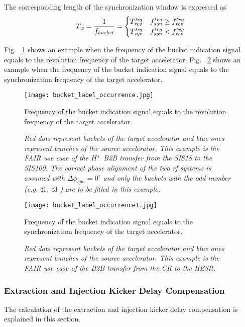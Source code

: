 The corresponding length of the synchronization window is expressed as
\begin{eqnarray}
T_\mathit{w}=\frac{1}{f_\mathit{bucket}}=
\begin{cases}
T_\mathit{rev}^\mathit{trg} &f_{\mathit{syn}}^{trg}\ge f_{\mathit{rev}}^{trg}\cr

T_\mathit{syn}^\mathit{trg}
&f_{\mathit{syn}}^{trg}<f_{\mathit{rev}}^{trg}
\end{cases}
\end{eqnarray}


Fig. ~\ref{bucket_label_occurrence} shows an example when the frequency of the bucket indication signal equals to the revolution frequency of the target accelerator. Fig. ~\ref{bucket_label_occurrence1} shows an example when the frequency of the bucket indication signal equals to the synchronization frequency of the target accelerator. 
\begin{figure}[!htb]
   \centering   
   \texttt{[image: bucket\_label\_occurrence.jpg]}
   \caption{Frequency of the bucket indication signal equals to the revolution frequency of the target accelerator.}
	\caption*{\textsl{\small{Red dots represent buckets of the target accelerator and blue ones represent bunches of the source accelerator. This example is the FAIR use case of the $H^+$ B2B transfer from the SIS18 to the SIS100. The correct phase alignment of the two rf systems is assumed with $\Delta\phi_\mathit{syn}=0^\circ$ and only the buckets with the odd number (e.g. $\sharp1$, $\sharp3$ ) are to be filled in this example.}}}
   \label{bucket_label_occurrence}
\end{figure}

\begin{figure}[!htb]
   \centering   
   \texttt{[image: bucket\_label\_occurrence1.jpg]}
   \caption{Frequency of the bucket indication signal equals to the synchronization frequency of the target accelerator.}
	\caption*{\textsl{\small{Red dots represent buckets of the target accelerator and blue ones represent bunches of the source accelerator. This example is the FAIR use case of the B2B transfer from the CR to the HESR. }}}
   \label{bucket_label_occurrence1}
\end{figure}



\subsubsection{Extraction and Injection Kicker Delay Compensation}
The calculation of the extraction and injection kicker delay compensation is explained in this section.

